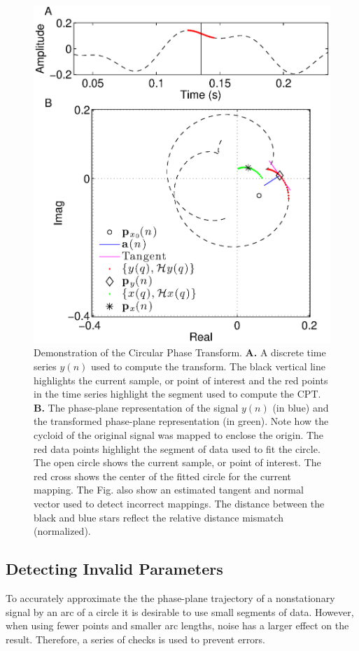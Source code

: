 \documentclass[journal,11pt,a4paper,onecolumn,draftcls]{IEEEtran}
\begin{document}
\begin{figure}
    \centering
    \includegraphics[scale=0.42]{./Figures/MappingDemonstration.eps}
    \caption[MappingDemo]{Demonstration of the Circular Phase Transform. \textbf{A.} A discrete time series $y(n)$ used to compute the transform. The black vertical line highlights the current sample, or point of interest and the red points in the time series highlight the segment used to compute the CPT. \textbf{B.} The phase-plane representation of the signal $y(n)$ (in blue) and the transformed phase-plane representation (in green). Note how the cycloid of the original signal was mapped to enclose the origin. The red data points highlight the segment of data used to fit the circle. The open circle shows the current sample, or point of interest. The red cross shows the center of the fitted circle for the current mapping. The Fig. also show an estimated tangent and normal vector used to detect incorrect mappings. The distance between the black and blue stars reflect the relative distance mismatch (normalized).}
    \label{fig:MappingDemo}
\end{figure}

\subsection{Detecting Invalid Parameters}\label{sect:DetectingInvalidParameters}
To accurately approximate the the phase-plane trajectory of a nonstationary signal by an arc of a circle it is desirable to use small segments of data. However, when using fewer points and smaller arc lengths, noise has a larger effect on the result. Therefore, a series of checks is used to prevent errors. 
\end{document}
